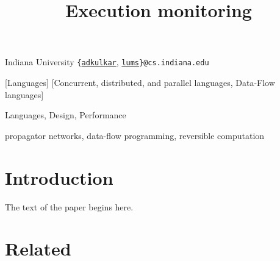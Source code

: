 \documentclass[preprint]{sigplanconf}
\begin{document}
\title{Execution monitoring}

           {Indiana University}
           {\texttt{\{}\href{mailto:adkulkar@cs.indiana.edu}{\texttt{adkulkar}},
             \href{mailto:lums@cs.indiana.edu}{\texttt{lums}}\texttt{\}}\texttt{@cs.indiana.edu}}

\maketitle


\begin{abstract}
\end{abstract}

[Languages]
[Concurrent, distributed, and parallel languages, Data-Flow languages]

\terms
Languages, Design, Performance

\keywords
propagator networks, data-flow programming, reversible computation


\section{Introduction}
\label{sec:intro}

The text of the paper begins here.

\section{Related}
\label{sec:related}

\citep{10.1109/IPDPS.2007.370254}



\end{document}
